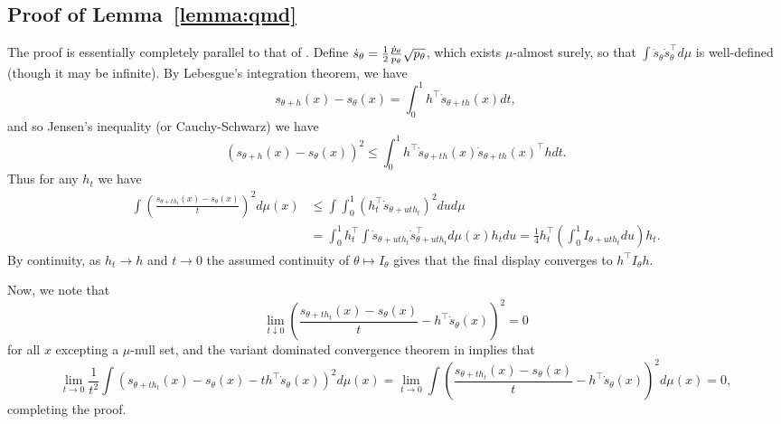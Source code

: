 \subsection{Proof of Lemma~\ref{lemma:qmd}}
\label{sec:proof-qmd}

The proof is essentially completely parallel to that of \cite[Lemma
  7.6]{VanDerVaart98}. Define $\dot{s}_\theta = \frac{1}{2}
\frac{\dot{p}_\theta}{p_\theta} \sqrt{p_\theta}$, which exists $\mu$-almost
surely, so that $\int \dot{s}_\theta \dot{s}_\theta^\top d\mu$ is
well-defined (though it may be infinite). By Lebesgue's integration theorem,
we have
\begin{equation*}
  s_{\theta + h}(x) - s_\theta(x) = \int_0^1 h^\top \dot{s}_{\theta + t h}(x) dt,
\end{equation*}
and so Jensen's inequality (or Cauchy-Schwarz) we have
\begin{equation*}
  (s_{\theta + h}(x) - s_\theta(x))^2
  \le \int_0^1 h^\top \dot{s}_{\theta + t h}(x)
  \dot{s}_{\theta + t h}(x) ^\top h dt.
\end{equation*}
Thus for any $h_t$ we have
\begin{align*}
  \int \left(\frac{s_{\theta + t h_t}(x) - s_\theta(x)}{t}\right)^2
  d\mu(x)
  & \le \int \int_0^1 (h_t^\top \dot{s}_{\theta + u t h_t})^2 du
  d\mu \\
  & = \int_0^1 h_t^\top \int
  \dot{s}_{\theta + u t h_t}\dot{s}_{\theta + u t h_t}^\top
  d\mu(x) h_t  du
  = \frac{1}{4} h_t^\top \left(\int_0^1 I_{\theta + u t h_t} du\right) h_t.
\end{align*}
By continuity, as $h_t \to h$ and $t \to 0$ the assumed continuity
of $\theta \mapsto I_\theta$ gives that the final display converges
to $h^\top I_\theta h$.

Now, we note that
\begin{equation*}
  \lim_{t \downarrow 0}
  \left(\frac{s_{\theta + t h_t}(x) - s_\theta(x)}{t}
  - h^\top \dot{s}_\theta(x)\right)^2 = 0
\end{equation*}
for all $x$ excepting a $\mu$-null set, and the
variant dominated convergence theorem in
\cite[Prop.~2.29]{VanDerVaart98} implies that
\begin{equation*}
  \lim_{t \to 0}
  \frac{1}{t^2}
  \int \left(s_{\theta + t h_t}(x) - s_\theta(x)
  - t h^\top \dot{s}_\theta(x)\right)^2 d\mu(x)
  = \lim_{t \to 0}
  \int \left(\frac{s_{\theta + t h_t}(x) - s_\theta(x)}{t}
  - h^\top \dot{s}_\theta(x)\right)^2 d\mu(x)
  = 0,
\end{equation*}
completing the proof.
